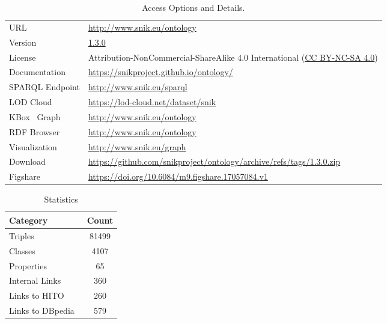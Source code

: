 \documentclass[conference]{IEEEtran}
\newcommand{\citep}{\cite}%
\newcommand{\snikversion}{1.3.0}
\newcommand{\snikversionlink}{\href{https://github.com/snikproject/ontology/releases/tag/\snikversion}{\snikversion}}
\newcommand{\sniktriples}{81499}
\newcommand{\snikclasses}{4107}
\newcommand{\snikproperties}{65}
\newcommand{\sniklinks}{579}
\begin{document}
\begin{table}
\caption{Access Options and Details.%
}
\label{tab:access}
\begin{tabulary}{\columnwidth}{lL}
\toprule
URL						&\url{http://www.snik.eu/ontology}\\
Version					&\snikversionlink{}\\
License					&Attribution-NonCommercial-ShareAlike 4.0 International (\href{https://creativecommons.org/licenses/by-nc-sa/4.0/}{CC BY-NC-SA 4.0})\\
Documentation	&\url{https://snikproject.github.io/ontology/}\\
SPARQL Endpoint			&\url{http://www.snik.eu/sparql}\\
LOD Cloud				&\url{https://lod-cloud.net/dataset/snik}\\
KBox~\cite{kbox} Graph	&\url{http://www.snik.eu/ontology}\\
RDF Browser				&\url{http://www.snik.eu/ontology}\\
Visualization			&\url{http://www.snik.eu/graph}\\
Download				&\url{https://github.com/snikproject/ontology/archive/refs/tags/\snikversion.zip}\\
Figshare				&\url{https://doi.org/10.6084/m9.figshare.17057084.v1}\\
\bottomrule
\end{tabulary}%
\end{table}

\begin{table}
\caption{Statistics}
\label{tab:statistics}
\centering
\begin{tabulary}{\columnwidth}{lS}
\toprule
\textbf{Category}					&\textbf{Count}\\
\midrule
Triples								&\sniktriples{}\\
Classes								&\snikclasses{}\\
Properties							&\snikproperties{}\\
Internal Links						&360\\
Links to HITO~\citep{hitometh2}  	&260\\
Links to DBpedia~\citep{dbpedia} 	&\sniklinks{}\\
\bottomrule
\end{tabulary}%
\end{table}
\end{document}
